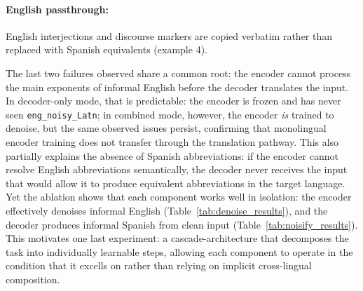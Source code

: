 \documentclass[11pt]{article}
\begin{document}
\paragraph{English passthrough:}English interjections and discourse markers are
copied verbatim rather than replaced with Spanish equivalents (example 4).


The last two failures observed share a common root: the encoder cannot process the main exponents of informal English before the decoder translates the input. In decoder-only mode, that is predictable: the encoder is frozen and has never seen \texttt{eng\_noisy\_Latn}; in combined mode, however, the encoder \emph{is} trained to denoise, but the same observed issues persist, confirming that monolingual encoder training does not transfer through the translation pathway. This also partially explains
the absence of Spanish abbreviations: if the encoder cannot resolve English abbreviations semantically, the decoder never receives the input that would allow it to produce equivalent abbreviations in the target language. Yet the ablation shows that each component works well in isolation: the encoder effectively denoises informal English (Table~\ref{tab:denoise_results}), and the decoder produces informal Spanish from clean input (Table~\ref{tab:noisify_results}). This motivates one last experiment: a cascade-architecture that decomposes the task into individually learnable steps, allowing each component to operate in the condition that it excells on rather than relying on implicit cross-lingual composition.
\end{document}
